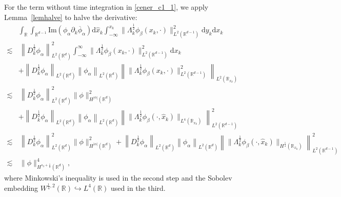 \documentclass[10pt,twoside,a4paper]{article}
\numberwithin{equation}{section}\allowdisplaybreaks
\begin{document}
For the term without time integration in \eqref{cener_c1_1}, we apply Lemma~\ref{lemhalve} to halve the derivative:
\begin{align} \label{cener_c1_4_1}
	&\int_{\mathbb{R}}  \int_{\mathbb{R}^{d-1}}  \mathrm{Im}\left( \phi_{\alpha } \partial_k \overline{\phi}_\alpha \right) \mathrm{d} \hat{x}_k \int_{-\infty}^{x_k} \|\Lambda_k^{\frac 12}\phi_{\beta}(x_k,\cdot)\|^2_{L^2(\mathbb{R}^{d-1})} \mathrm{d} y_k  \mathrm{d} x_k \nonumber\\
	\lesssim &\,\left\|   D_k^{\frac 12}\phi_\alpha\right\|_{L^2(\mathbb{R}^d)}^2 \int_{-\infty}^{\infty} \|\Lambda_k^{\frac 12}\phi_{\beta}(x_k,\cdot)\|^2_{L^2(\mathbb{R}^{d-1})}\mathrm{d} x_k\nonumber\\
	&+\left\|   D_k^{\frac 12}\phi_{\alpha}\right\|_{L^2(\mathbb{R}^d)} \left\|   \phi_{\alpha}\right\|_{L^2(\mathbb{R}^d)} \left\| \|\Lambda_k^{\frac 12}\phi_{\beta}(x_k,\cdot)\|^2_{L^2(\mathbb{R}^{d-1})}\right\|_{L^2(\mathbb{R}_{x_k})}\\
	\lesssim &\,\left\|   D_k^{\frac 12}\phi_\alpha\right\|_{L^2(\mathbb{R}^d)}^2 \|\phi\|_{H^{|\alpha|}(\mathbb{R}^d)}^2\nonumber\\
	&+\left\|   D_k^{\frac 12}\phi_{\alpha}\right\|_{L^2(\mathbb{R}^d)} \left\|   \phi_{\alpha}\right\|_{L^2(\mathbb{R}^d)}\left\| \|\Lambda_k^{\frac 12}\phi_{\beta}(\cdot,\hat{x}_k)\|_{L^4(\mathbb{R}_{x_k})} \right\|_{L^{2}(\mathbb{R}^{d-1})}^2\nonumber\\
	\lesssim &\,\left\|   D_k^{\frac 12}\phi_\alpha\right\|_{L^2(\mathbb{R}^d)}^2 \|\phi\|_{H^{|\alpha|}(\mathbb{R}^d)}^2\nonumber+\left\|   D_k^{\frac 12}\phi_{\alpha}\right\|_{L^2(\mathbb{R}^d)} \left\|   \phi_{\alpha}\right\|_{L^2(\mathbb{R}^d)}\left\| \|\Lambda_k^{\frac 12}\phi_{\beta}(\cdot,\hat{x}_k)\|_{H^{\frac14}(\mathbb{R}_{x_k})} \right\|_{L^{2}(\mathbb{R}^{d-1})}^2\nonumber\\
	\lesssim &\,\|\phi\|^4_{H^{s_3+\frac 12}(\mathbb{R}^{d})},\nonumber
\end{align}
where Minkowski's inequality is used in the second step and the Sobolev embedding $ W^{\frac14,2}(\mathbb{R}) \hookrightarrow L^4(\mathbb{R}) $  used in the third.
\end{document}
